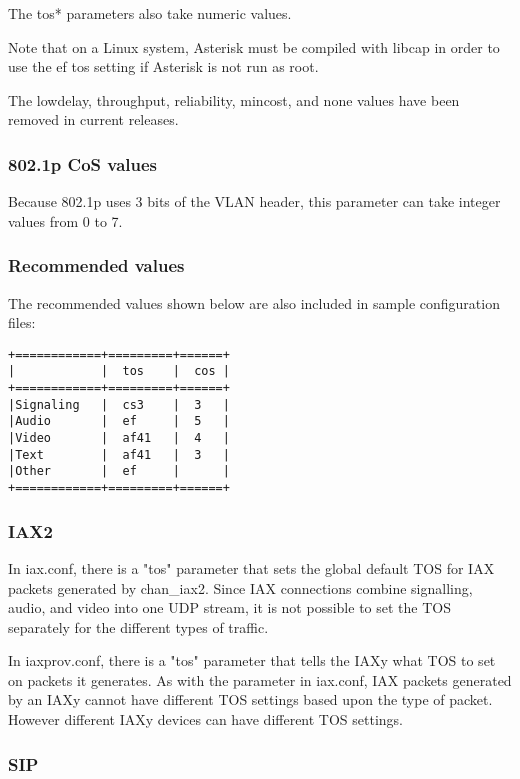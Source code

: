 The tos* parameters also take numeric values.

Note that on a Linux system, Asterisk must be compiled with libcap in order to
use the ef tos setting if Asterisk is not run as root.

The lowdelay, throughput, reliability, mincost, and none values have been removed
in current releases.

\subsubsection{802.1p CoS values}

Because 802.1p uses 3 bits of the VLAN header, this parameter can take integer
values from 0 to 7.

\subsubsection{Recommended values}
The recommended values shown below are also included in sample configuration files:
\begin{verbatim}
+============+=========+======+
|            |  tos    |  cos |
+============+=========+======+
|Signaling   |  cs3    |  3   |
|Audio       |  ef     |  5   |
|Video       |  af41   |  4   |
|Text        |  af41   |  3   |
|Other       |  ef     |      |
+============+=========+======+
\end{verbatim}

\subsubsection{IAX2}

In iax.conf, there is a "tos" parameter that sets the global default TOS
for IAX packets generated by chan\_iax2.  Since IAX connections combine
signalling, audio, and video into one UDP stream, it is not possible
to set the TOS separately for the different types of traffic.

In iaxprov.conf, there is a "tos" parameter that tells the IAXy what TOS
to set on packets it generates.  As with the parameter in iax.conf,
IAX packets generated by an IAXy cannot have different TOS settings
based upon the type of packet.  However different IAXy devices can
have different TOS settings.

\subsubsection{SIP}

